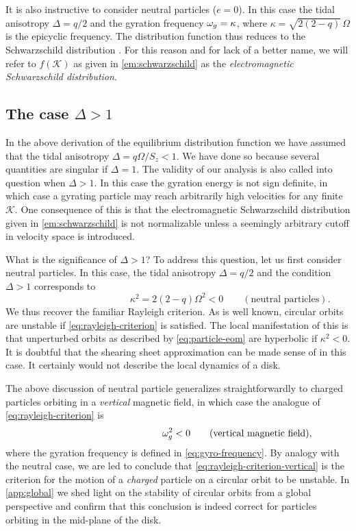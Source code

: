 \documentclass[aps,pre,notitlepage,amsmath,amssymb,amsfonts,nobibnotes,nofootinbib,superscriptaddress]{revtex4-1}
\begin{document}
It is also instructive to consider neutral particles ($e=0$). In this case the
tidal anisotropy $\Delta=q/2$ and the gyration frequency $\omega_g=\kappa$, where
$\kappa=\sqrt{2(2-q)}\,\Omega$ is the epicyclic frequency. The distribution
function  thus reduces to the Schwarzschild
distribution \citep[see e.g.][]{Julian1966}. For this reason and for lack of a
better name, we will refer to $f(\mathcal{K})$ as given in
\cref{em:schwarzschild} as the \emph{electromagnetic Schwarzschild
distribution}.

\subsection{The case $\Delta>1$}
\label{sec:delta}

In the above derivation of the equilibrium distribution function we have
assumed that the tidal anisotropy \mbox{$\Delta=q\Omega/S_z<1$}. We have done
so because several quantities are singular if $\Delta=1$. The validity of our
analysis is also called into question when $\Delta>1$. In this case the
gyration energy is not sign definite, in which case a gyrating particle may
reach arbitrarily high velocities for any finite $\mathcal{K}$. One
consequence of this is that the electromagnetic Schwarzschild distribution
given in \cref{em:schwarzschild} is not normalizable unless a seemingly
arbitrary cutoff in velocity space is introduced.

What is the significance of $\Delta>1$? To address this question, let us first
consider neutral particles. In this case, the tidal anisotropy $\Delta=q/2$
and the condition $\Delta>1$ corresponds to
\begin{equation}
  \label{eq:rayleigh-criterion}
  \phantom{\qquad(\textrm{neutral particles})}
  \kappa^2 = 2(2-q)\Omega^2 < 0
  \qquad(\textrm{neutral particles}).
\end{equation}
We thus recover the familiar Rayleigh criterion. As is well known, circular
orbits are unstable if \cref{eq:rayleigh-criterion} is satisfied. The local
manifestation of this is that unperturbed orbits as described by
\cref{eq:particle-eom} are hyperbolic if $\kappa^2<0$. It is doubtful that the
shearing sheet approximation can be made sense of in this case. It certainly
would not describe the local dynamics of a disk.

The above discussion of neutral particle generalizes straightforwardly to
charged particles orbiting in a \emph{vertical} magnetic field, in which case
the analogue of \cref{eq:rayleigh-criterion} is
\begin{equation}
  \label{eq:rayleigh-criterion-vertical}
  \phantom{\qquad(\textrm{vertical magnetic field})}
  \omg^2 < 0
  \qquad(\textrm{vertical magnetic field}),
\end{equation}
where the gyration frequency is defined in \cref{eq:gyro-frequency}. By
analogy with the neutral case, we are led to conclude that
\cref{eq:rayleigh-criterion-vertical} is the criterion for the motion of a
\emph{charged} particle on a circular orbit to be unstable. In
\cref{app:global} we shed light on the stability of circular orbits from a
global perspective and confirm that this conclusion is indeed correct for
particles orbiting in the mid-plane of the disk.
\end{document}
